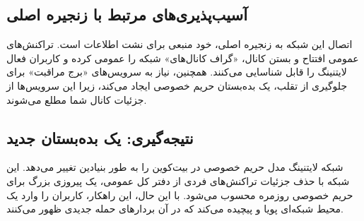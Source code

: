 \subsection{آسیب‌پذیری‌های مرتبط با زنجیره اصلی}
اتصال این شبکه به زنجیره اصلی، خود منبعی برای نشت اطلاعات است. تراکنش‌های عمومی افتتاح و بستن کانال، «گراف کانال‌های» شبکه را عمومی کرده و کاربران فعال لایتنینگ را قابل شناسایی می‌کنند. همچنین، نیاز به سرویس‌های «برج مراقبت» برای جلوگیری از تقلب، یک بده‌بستان حریم خصوصی ایجاد می‌کند، زیرا این سرویس‌ها از جزئیات کانال شما مطلع می‌شوند.

\subsection{نتیجه‌گیری: یک بده‌بستان جدید}
شبکه لایتنینگ مدل حریم خصوصی در بیت‌کوین را به طور بنیادین تغییر می‌دهد. این شبکه با حذف جزئیات تراکنش‌های فردی از دفتر کل عمومی، یک پیروزی بزرگ برای حریم خصوصی روزمره محسوب می‌شود. با این حال، این راهکار، کاربران را وارد یک محیط شبکه‌ای پویا و پیچیده می‌کند که در آن بردارهای حمله جدیدی ظهور می‌کنند.